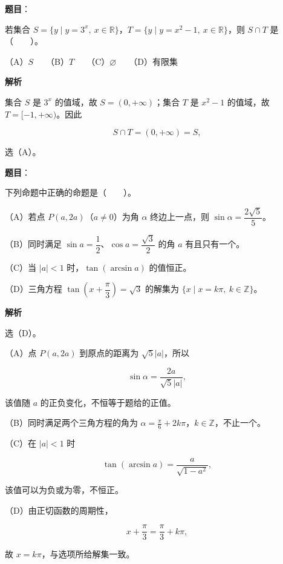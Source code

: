 \begin{answer}

\textbf{题目}：

若集合 $S=\{y\mid y=3^x,\ x\in\mathbb{R}\}$，$T=\{y\mid y=x^2-1,\ x\in\mathbb{R}\}$，则 $S\cap T$ 是\mbox{（　　）}。

（A）$S$　　（B）$T$　　（C）$\varnothing$　　（D）有限集

\textbf{解析}

集合 $S$ 是 $3^x$ 的值域，故 $S=(0,+\infty)$；集合 $T$ 是 $x^2-1$ 的值域，故 $T=[-1,+\infty)$。因此

\nopagebreak[4]
\[
S\cap T=(0,+\infty)=S,
\]

选（A）。


\end{answer}
\begin{answer}

\textbf{题目}：

下列命题中正确的命题是\mbox{（　　）}。

（A）若点 $P(a,2a)$（$a\neq 0$）为角 $\alpha$ 终边上一点，则 $\sin\alpha=\dfrac{2\sqrt{5}}{5}$。

（B）同时满足 $\sin a=\dfrac{1}{2}$、$\cos a=\dfrac{\sqrt{3}}{2}$ 的角 $a$ 有且只有一个。

（C）当 $|a|<1$ 时，$\tan(\arcsin a)$ 的值恒正。

（D）三角方程 $\tan\left(x+\dfrac{\pi}{3}\right)=\sqrt{3}$ 的解集为 $\{x\mid x=k\pi,\ k\in\mathbb{Z}\}$。

\textbf{解析}

选（D）。

（A）点 $P(a,2a)$ 到原点的距离为 $\sqrt5|a|$，所以

\nopagebreak[4]
\[
\sin\alpha=\frac{2a}{\sqrt5|a|},
\]

该值随 $a$ 的正负变化，不恒等于题给的正值。

（B）同时满足两个三角方程的角为 $\alpha=\frac\pi6+2k\pi$，$k\in\mathbb Z$，不止一个。

（C）在 $|a|<1$ 时

\nopagebreak[4]
\[
\tan(\arcsin a)=\frac{a}{\sqrt{1-a^2}},
\]

该值可以为负或为零，不恒正。

（D）由正切函数的周期性，

\nopagebreak[4]
\[
x+\frac\pi3=\frac\pi3+k\pi,
\]

故 $x=k\pi$，与选项所给解集一致。


\end{answer}

